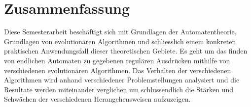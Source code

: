 \clearpage
{}
\vspace*{\fill}
\section*{\centering Zusammenfassung}
Diese Semesterarbeit beschäftigt sich mit Grundlagen der Automatentheorie, Grundlagen von evolutionären Algorithmen und schliesslich einem konkreten praktischen Anwendungsfall dieser theoretischen Gebiete. Es geht um das finden von endlichen Automaten zu gegebenen regulären Ausdrücken mithilfe von verschiedenen evolutionären Algorithmen. Das Verhalten der verschiedenen Algorithmen wird anhand verschiedener Problemstellungen analysiert und die Resultate werden miteinander verglichen um schlussendlich die Stärken und Schwächen der verschiedenen Herangehensweisen aufzuzeigen.
\vspace*{\fill}


